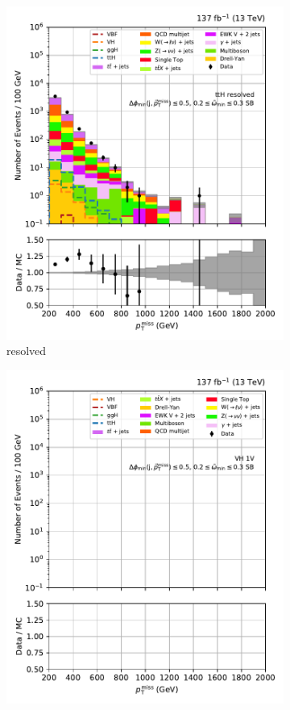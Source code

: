 \begin{figure}[htbp]
\begin{subfigure}[b]{0.24\textwidth}
        \includegraphics[width=\textwidth]{figures/region_plots/full_Run2/sideband_1/ttH_resolved.pdf}
        \caption{\ttH resolved}
    \end{subfigure}
    \hfill
    \begin{subfigure}[b]{0.24\textwidth}
        \includegraphics[width=\textwidth]{figures/region_plots/full_Run2/sideband_1/VH_1V.pdf}

\end{subfigure}
\end{figure}
